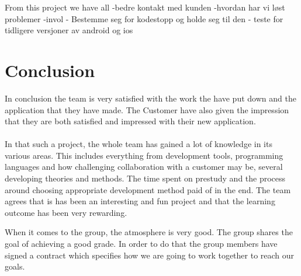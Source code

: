 From this project we have all 
-bedre kontakt med kunden
-hvordan har vi løst problemer
-invol
- Bestemme seg for kodestopp og holde seg til den
- teste for tidligere versjoner av android og ios

\section{Conclusion}
In conclusion the team is very satisfied with the work the have put down and the application that they have made. The Customer have also given the impression that they are both satisfied and impressed with their new application.\\
\\
In that such a project, the whole team has gained a lot of knowledge in its various areas. This includes everything from development tools, programming languages and how challenging collaboration with a customer may be, several developing theories and methods. The time spent on prestudy and the process around choosing appropriate development method paid of in the end. The team agrees that is has been an interesting and fun project and that the learning outcome has been very rewarding.  

\iffalse må flyttes\fi
When it comes to the group, the atmosphere is very good. The group shares the goal of achieving a good grade. In order to do that the group members have signed a contract which specifies how we are going to work together to reach our goals. 
